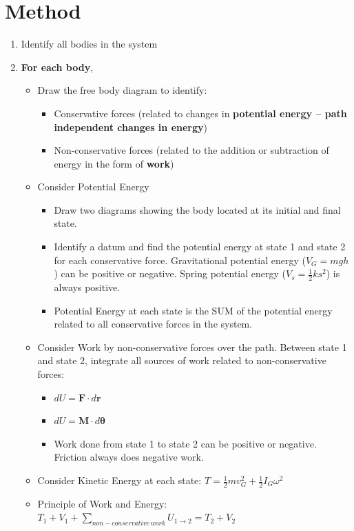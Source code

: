 \documentclass[12pt,letterpaper,twoside]{report}
\begin{document}
\section{Method}
\begin{enumerate}
\item Identify all bodies in the system
\item \textbf{For each body}, 
\begin{itemize}
\item Draw the free body diagram to identify:
\begin{itemize}
\item Conservative forces (related to changes in \textbf{potential energy – path independent changes in energy})
\item Non-conservative forces (related to the addition or subtraction of energy in the form of \textbf{work})
\end{itemize}
\item Consider Potential Energy
\begin{itemize}
\item Draw two diagrams showing the body located at its initial and final state.
\item Identify a datum and find the potential energy at state 1 and state 2 for each conservative force.  Gravitational potential energy ($V_G =mgh$) can be positive or negative.  Spring potential energy ($V_s = \frac{1}{2} k s^2$) is always positive.
\item Potential Energy at each state is the SUM of the potential energy related to all conservative forces in the system.
\end{itemize}
\item Consider Work by non-conservative forces over the path.  Between state 1 and state 2, integrate all sources of work related to non-conservative forces:
\begin{itemize}
\item $dU = \bm{F} \cdot d \bm{r}$
\item $dU = \bm{M} \cdot d \bm{\theta}$
\item Work done from state 1 to state 2 can be positive or negative.  Friction always does negative work.  
\end{itemize}
\item Consider Kinetic Energy at each state: $T = \frac{1}{2} m v_G^2 + \frac{1}{2} I_G \omega^2$
\item Principle of Work and Energy: $T_1 + V_1 + \sum_{non-conservative \,work}U_{1 \rightarrow 2} = T_2 + V_2$
\end{itemize}
\end{enumerate}
\end{document}
